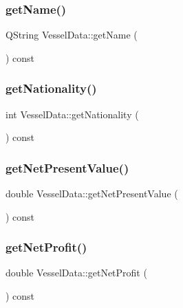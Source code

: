 \mbox{\label{class_vessel_data_a9051ea580e3592826d4ad473ed14c3d9}} 
\subsubsection{\texorpdfstring{getName()}{getName()}}
{\footnotesize\ttfamily Q\+String Vessel\+Data\+::get\+Name (\begin{DoxyParamCaption}{ }\end{DoxyParamCaption}) const}

\mbox{\label{class_vessel_data_a3ea2adb9b065c2bc2650796263ae1e74}} 
\subsubsection{\texorpdfstring{getNationality()}{getNationality()}}
{\footnotesize\ttfamily int Vessel\+Data\+::get\+Nationality (\begin{DoxyParamCaption}{ }\end{DoxyParamCaption}) const}

\mbox{\label{class_vessel_data_a5cf7d716425daebcb82f4b1d077e4ef7}} 
\subsubsection{\texorpdfstring{getNetPresentValue()}{getNetPresentValue()}}
{\footnotesize\ttfamily double Vessel\+Data\+::get\+Net\+Present\+Value (\begin{DoxyParamCaption}{ }\end{DoxyParamCaption}) const}

\mbox{\label{class_vessel_data_a252cf0af7b88a207b8d7a82250c4b07e}} 
\subsubsection{\texorpdfstring{getNetProfit()}{getNetProfit()}}
{\footnotesize\ttfamily double Vessel\+Data\+::get\+Net\+Profit (\begin{DoxyParamCaption}{ }\end{DoxyParamCaption}) const}

